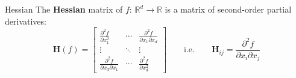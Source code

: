 \documentclass{beamer}
\begin{document}
\begin{frame}{Hessian}
The \textbf{Hessian} matrix of $f:\,\mathbb{R}^d\to\mathbb{R}$ is a matrix of second-order partial derivatives:
$$
\mathbf{H}(f)=\begin{bmatrix}
\frac{\partial^2 f}{\partial x_1^2} & \cdots & \frac{\partial^2 f}{\partial x_1\partial x_d} \\
\vdots & \ddots & \vdots \\
\frac{\partial^2 f}{\partial x_d\partial x_1} & \cdots & \frac{\partial^2 f}{\partial x_d^2}
\end{bmatrix}\qquad\text{i.e.}\qquad\mathbf{H}_{ij}=\frac{\partial^2 f}{\partial x_i\partial x_j}
$$
\end{frame}
\end{document}
